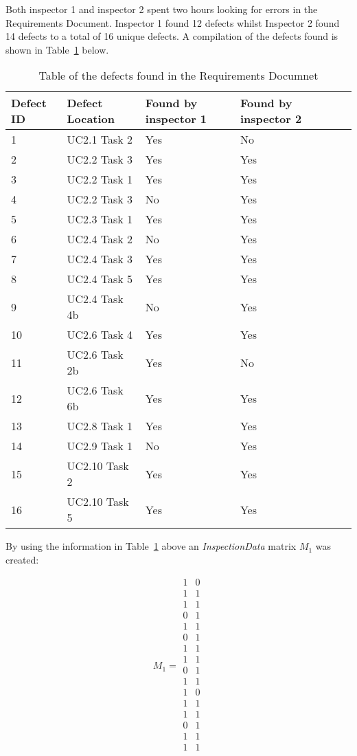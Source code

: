 Both inspector 1 and inspector 2 spent two hours looking for errors in the Requirements Document.
Inspector 1 found 12 defects whilst Inspector 2 found 14 defects to a total of 16 unique defects.
A compilation of the defects found is shown in Table~\ref{defectlist} below.

\begin{table}[!htb]
\centering
\caption{Table of the defects found in the Requirements Documnet}
\label{defectlist}
\begin{tabular}{|l|l|l|l|l|l|}
\hline  Defect ID & Defect Location   & Found by inspector 1  & Found by inspector 2\\ \hline
1       & UC2.1 Task 2  & Yes  & No \\
2       & UC2.2 Task 3   & Yes  & Yes  \\
3       & UC2.2 Task 1   & Yes & Yes      \\
4       & UC2.2 Task 3   & No & Yes   \\
5         & UC2.3 Task 1 & Yes  & Yes     \\
6         & UC2.4 Task 2 & No   & Yes      \\
7         & UC2.4 Task 3 & Yes & Yes      \\
8       & UC2.4 Task 5 & Yes & Yes      \\
9       & UC2.4 Task 4b & No     & Yes   \\
10       & UC2.6 Task 4   & Yes      & Yes    \\
11       & UC2.6 Task 2b & Yes      & No   \\   
12       & UC2.6 Task 6b   & Yes      & Yes    \\
13       & UC2.8 Task 1   & Yes      & Yes    \\
14       & UC2.9 Task 1   & No      & Yes    \\     
15       & UC2.10 Task 2   & Yes      & Yes    \\
16       & UC2.10 Task 5   & Yes      & Yes    \\  \hline     
\end{tabular}
\end{table}

By using the information in Table~\ref{defectlist} above an \textit{InspectionData} matrix $M_{1}$ was created:



\[
M_{1} =
\begin{array}{cc}
 1 & 0 \\
 1 & 1 \\
 1 & 1 \\
 0 & 1 \\
 1 & 1 \\
 0 & 1 \\
 1 & 1 \\
 1 & 1 \\
 0 & 1 \\
 1 & 1 \\
 1 & 0 \\
 1 & 1 \\
 1 & 1 \\
 0 & 1 \\
 1 & 1 \\
 1 & 1 \\
\end{array}
\]


